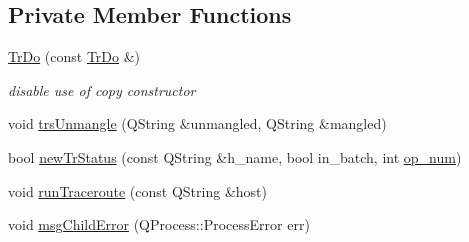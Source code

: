 \subsection*{Private Member Functions}
\begin{CompactItemize}
\item 
\hypertarget{classTrDo_b24c01ebac00edcc1052ea56be63f525}{
\hyperlink{classTrDo_b24c01ebac00edcc1052ea56be63f525}{TrDo} (const \hyperlink{classTrDo}{TrDo} \&)}
\label{classTrDo_b24c01ebac00edcc1052ea56be63f525}

\begin{CompactList}\small\item\em disable use of copy constructor \item\end{CompactList}\item 
void \hyperlink{classTrDo_3bbf80bc98ceb20339ff0497c99ba199}{trsUnmangle} (QString \&unmangled, QString \&mangled)
\item 
bool \hyperlink{classTrDo_049d408bb8a464a9e8f69c2b1f909c14}{newTrStatus} (const QString \&h\_\-name, bool in\_\-batch, int \hyperlink{classTrDo_7191eabfb34969b212cc63781de586f9}{op\_\-num})
\item 
void \hyperlink{classTrDo_04829a8efd9827ec069150bb3a9880ff}{runTraceroute} (const QString \&host)
\item 
void \hyperlink{classTrDo_2725ad3cfadba888fb540ea9189f07b3}{msgChildError} (QProcess::ProcessError err)
\end{CompactItemize}
